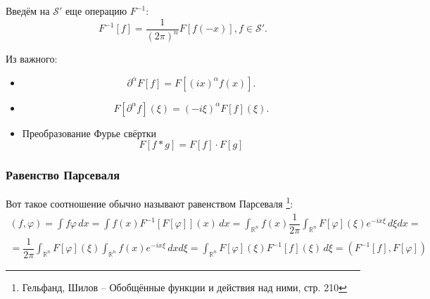 Введём на $\mathcal{S}'$ еще операцию $F^{-1}$:
\[
  F^{-1}[f] = \dfrac{1}{(2\pi)^n} F[f(-x)], f\in\mathcal{S}'.
\]

Из важного:
\begin{itemize}
  \item 
    \[
      \partial^\alpha F[f] = F \left[ (ix)^\alpha f(x) \right].
    \]
  \item
    \[
      F \left[ \partial^\alpha f \right] (\xi) = (-i\xi)^\alpha F[f] (\xi).
    \]
  \item Преобразование Фурье свёртки
    \[
      F \left[ f * g \right] = F[f] \cdot F[g]
    \]
\end{itemize}

\subsubsection{Равенство Парсеваля}

Вот такое соотношение обычно называют равенством Парсеваля \footnote{Гельфанд, Шилов -- Обобщённые функции и действия над ними, стр. 210}:
\begin{multline*}
  (f, \varphi) = \int f \varphi \, dx = \int f(x) F^{-1} [ F[\varphi] ] (x) \, dx
  = \int_{\mathbb{R}^n} f(x) \dfrac{1}{2\pi}\int_{\mathbb{R}^n} F[\varphi] (\xi) e^{-ix \xi} \, d\xi dx = \\
  = \dfrac{1}{2\pi}\int_{\mathbb{R}^n} F[\varphi](\xi) \int_{\mathbb{R}^n} f(x) e^{-ix \xi} \, dx d\xi
  = \int_{\mathbb{R}^n} F[\varphi](\xi) F^{-1} [f] (\xi) \, d\xi
  = (F^{-1} [f], F[\varphi])
\end{multline*}
